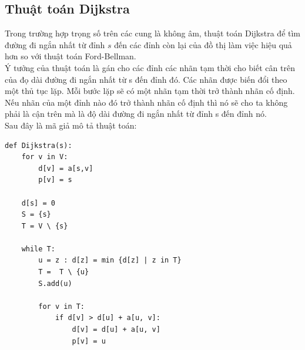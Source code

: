 \documentclass[a4paper,12pt]{report}
\begin{document}

\subsection{Thuật toán Dijkstra}
	Trong trường hợp trọng số trên các cung là không âm, thuật toán Dijkstra để tìm đường đi ngắn nhất từ đỉnh $ s $ đến các đỉnh còn lại của đồ thị làm việc hiệu quả hơn so với thuật toán Ford-Bellman.\\
	Ý tưởng của thuật toán là gán cho các đỉnh các nhãn tạm thời cho biết cân trên của đọ dài đường đi ngắn nhất từ s đến đỉnh đó. Các nhãn được biến đổi theo một thủ tục lặp. Mỗi bước lặp sẽ có một nhãn tạm thời trở thành nhãn cố định. Nếu nhãn của một đỉnh nào đó trở thành nhãn cố định thì nó sẽ cho ta không phải là cận trên mà là độ dài đường đi ngắn nhất từ đỉnh s đến đỉnh nó.\\
	Sau đây là mã giả mô tả thuật toán:\\
\begin{verbatim}		
def Dijkstra(s):
    for v in V:
        d[v] = a[s,v]
        p[v] = s
    
    d[s] = 0
    S = {s}
    T = V \ {s}
   
    while T:
        u = z : d[z] = min {d[z] | z in T}
        T =  T \ {u}
        S.add(u)
	
        for v in T:
            if d[v] > d[u] + a[u, v]:
	            d[v] = d[u] + a[u, v]
                p[v] = u
\end{verbatim}
\end{document}
